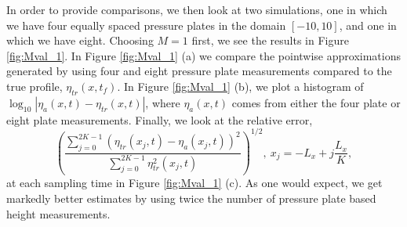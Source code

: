 In order to provide comparisons, we then look at two simulations, one in which we have four equally spaced pressure plates in the domain $[-10,10]$, and one in which we have eight.  Choosing $M=1$ first, we see the results in Figure \ref{fig:Mval_1}.  In Figure \ref{fig:Mval_1} (a) we compare the pointwise approximations generated by using four and eight pressure plate measurements compared to the true profile, $\eta_{tr}(x,t_{f})$.  In Figure \ref{fig:Mval_1} (b), we plot a histogram of $\log_{10}|\eta_{a}(x,t) - \eta_{tr}(x,t)|$, where $\eta_{a}(x,t)$ comes from either the four plate or eight plate measurements.  Finally, we look at the relative error, 
\[
\left(\frac{\sum_{j=0}^{2K-1} \left( \eta_{tr}(x_{j},t) - \eta_{a}(x_{j},t) \right)^{2}}{\sum_{j=0}^{2K-1}\eta_{tr}^{2}(x_{j},t)}\right)^{1/2}, ~ x_{j} = -L_{x} + j\frac{L_{x}}{K},
\]
at each sampling time in Figure \ref{fig:Mval_1} (c).  As one would expect, we get markedly better estimates by using twice the number of pressure plate based height measurements.  
